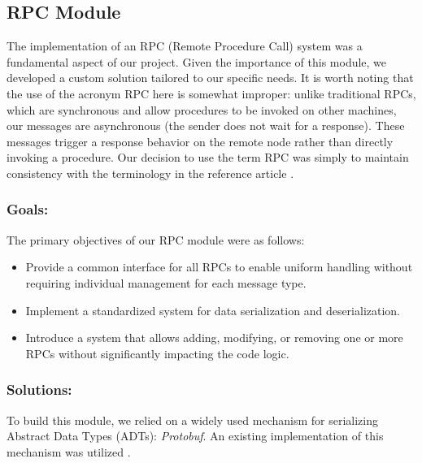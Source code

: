 \subsection{RPC Module}
The implementation of an RPC (Remote Procedure Call) system was a fundamental aspect of our project. 
Given the importance of this module, we developed a custom solution tailored to our specific needs. 
It is worth noting that the use of the acronym RPC here is somewhat improper: unlike traditional RPCs, 
which are synchronous and allow procedures to be invoked on other machines, our messages are 
asynchronous (the sender does not wait for a response). These messages trigger a response behavior 
on the remote node rather than directly invoking a procedure. Our decision to use the term RPC 
was simply to maintain consistency with the terminology in the reference article \cite{1}.

\subsubsection{Goals:\\}
The primary objectives of our RPC module were as follows:
\begin{itemize}
	\item Provide a common interface for all RPCs to enable uniform handling without requiring individual management for each message type.
	\item Implement a standardized system for data serialization and deserialization.
	\item Introduce a system that allows adding, modifying, or removing one or more RPCs without significantly impacting the code logic.
\end{itemize}

\subsubsection{Solutions:\\}
To build this module, we relied on a widely used mechanism for serializing Abstract Data Types 
(ADTs): \textit{Protobuf}. An existing implementation of this mechanism was utilized \cite{5}.

